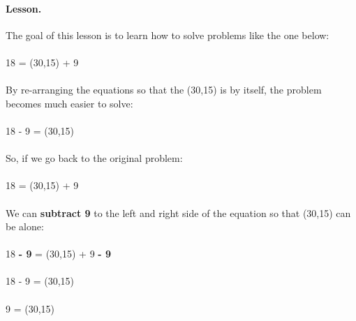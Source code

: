\documentclass[12pt]{article}
\begin{document}
\paragraph{Lesson.}
The goal of this lesson is to learn how to solve problems like the one below: \\
\\
18 = \framebox(30,15){} + 9
\\
\\
By re-arranging the equations so that the \framebox(30,15){} is by itself, the problem becomes much easier to solve: \\
\\
18 - 9 = \framebox(30,15){}
\\
\\
So, if we go back to the original problem: \\
\\
18 = \framebox(30,15){} + 9
\\
\\
We can \textbf{subtract 9} to the left and right side of the equation so that \framebox(30,15){} can be alone: \\
\\
18 \textbf{- 9} = \framebox(30,15){} + 9 \textbf{- 9} \\
\\
18 - 9 = \framebox(30,15){} \\
\\
9 = \framebox(30,15){}

\newpage


\newpage
\end{document}
